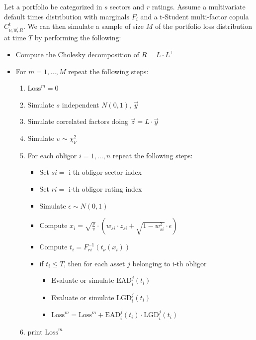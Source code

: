 \documentclass[11pt,fleqn]{book} %
\begin{document}
\begin{algorithm}
	\label{alg:pldmc}
	Let a portfolio be categorized in $s$ sectors and $r$ ratings.
	Assume a multivariate default times distribution with marginals $F_i$
	and a t-Student multi-factor copula $C_{\nu,\vec{w},R}^{\text{t}}$.
	We can then simulate a sample of size $M$ of the portfolio loss distribution
	at time $T$ by performing the following:
	\begin{itemize}
		\item Compute the Cholesky decomposition of $R = L \cdot L^\intercal$
		\item For $m=1,\dots,M$ repeat the following steps:
		\begin{enumerate}
			\item $\text{Loss}^m = 0$
			\item Simulate $s$ independent $N(0,1)$, $\vec{y}$
			\item Simulate correlated factors doing $\vec{z} = L \cdot \vec{y}$
			\item Simulate $\upsilon \sim \chi_{\nu}^2$
			\item For each obligor $i=1,\dots,n$ repeat the following steps:
			\begin{itemize}
				\item Set $si = $ i-th obligor sector index
				\item Set $ri = $ i-th obligor rating index
				\item Simulate $\epsilon \sim N(0,1)$
				\item Compute $x_i = \sqrt{\frac{\nu}{\upsilon}} \cdot \left( w_{si} \cdot z_{si} + \sqrt{1-w_{si}^2} \cdot \epsilon \right)$
				\item Compute $t_i = F_{ri}^{-1}\left(t_{\nu}(x_i)\right)$
				\item if $t_i \le T$, then for each asset $j$ belonging to i-th obligor
				\begin{itemize}
					\item Evaluate or simulate $\text{EAD}_i^j(t_i)$
					\item Evaluate or simulate $\text{LGD}_i^j(t_i)$
					\item $\text{Loss}^m = \text{Loss}^m + \text{EAD}_i^j(t_i) \cdot \text{LGD}_i^j(t_i)$
				\end{itemize}
			\end{itemize}
			\item print $\text{Loss}^m$
		\end{enumerate}
	\end{itemize}
\end{algorithm}
\end{document}

